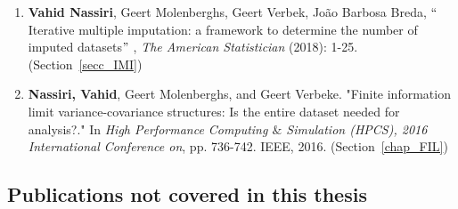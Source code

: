 \documentclass[11pt,a5paper,twoside]{book}
\begin{document}
\begin{enumerate}
	
	
	\item \textbf{\textcolor[HTML]{222222}{Vahid Nassiri}}\textcolor[HTML]{222222}{, Geert Molenberghs, Geert Verbek, João Barbosa Breda, $``$Iterative multiple imputation: a framework to determine the number of imputed datasets$"$ , \textit{The American Statistician} (2018): 1-25.} (Section~\ref{secc_IMI})
	
	\item \textbf{\textcolor[HTML]{222222}{Nassiri, Vahid}}\textcolor[HTML]{222222}{, Geert Molenberghs, and Geert Verbeke. "Finite information limit variance-covariance structures: Is the entire dataset needed for analysis?." In \textit{High Performance Computing $\&$  Simulation (HPCS), 2016 International Conference on}, pp. 736-742. IEEE, 2016.} (Section~\ref{chap_FIL})
\end{enumerate}
 
\subsection{Publications not covered in this thesis}
\end{document}
